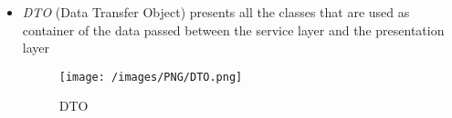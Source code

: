 \begin{itemize}
\begin{itemize}
	\end{itemize}
	\item \emph{DTO} (Data Transfer Object) presents all the classes that are used as container of the data passed between the service layer and the presentation layer
	
	\begin{figure}[H]
	\begin{center}
	\texttt{[image: /images/PNG/DTO.png]}
	\caption{DTO}
	\end{center}
	\end{figure}
	
\end{itemize}
%